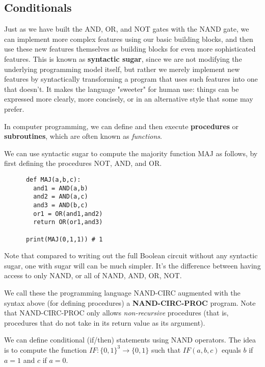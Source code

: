 \subsection{Conditionals}

  Just as we have built the AND, OR, and NOT gates with the NAND gate, we can implement more complex features using our basic building blocks, and then use these new features themselves as building blocks for even more sophisticated features. This is known as \textbf{syntactic sugar}, since we are not modifying the underlying programming model itself, but rather we merely implement new features by syntactically transforming a program that uses such features into one that doesn’t. It makes the language "sweeter" for human use: things can be expressed more clearly, more concisely, or in an alternative style that some may prefer.

  In computer programming, we can define and then execute \textbf{procedures} or \textbf{subroutines}, which are often known as \textit{functions}. 

  \begin{example}
    We can use syntactic sugar to compute the majority function MAJ as follows, by first defining the procedures NOT, AND, and OR. 
    \begin{lstlisting}
      def MAJ(a,b,c): 
        and1 = AND(a,b)
        and2 = AND(a,c) 
        and3 = AND(b,c)
        or1 = OR(and1,and2) 
        return OR(or1,and3)

      print(MAJ(0,1,1)) # 1
    \end{lstlisting}
  \end{example}

  Note that compared to writing out the full Boolean circuit without any syntactic sugar, one with sugar will can be much simpler. It's the difference between having access to only NAND, or all of NAND, AND, OR, NOT. 

  \begin{definition}
    We call these the programming language NAND-CIRC augmented with the syntax above (for defining procedures) a \textbf{NAND-CIRC-PROC} program. Note that NAND-CIRC-PROC only allows \textit{non-recursive} procedures (that is, procedures that do not take in its return value as its argument). 
  \end{definition}

  We can define conditional (if/then) statements using NAND operators. The idea is to compute the function $IF: \{0,1\}^3 \longrightarrow \{0,1\}$ such that $IF(a, b, c)$ equals $b$ if $a = 1$ and $c$ if $a = 0$. 

